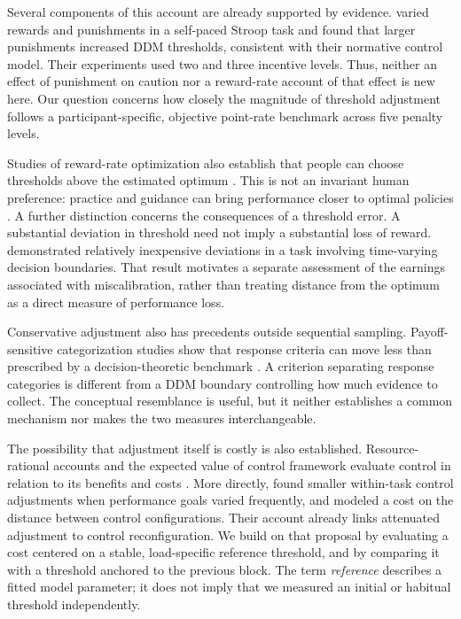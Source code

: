 \documentclass[10pt,letterpaper]{article}
\begin{document}
Several components of this account are already supported by evidence. \citet{leng2021} varied rewards and punishments in a self-paced Stroop task and found that larger punishments increased DDM thresholds, consistent with their normative control model. Their experiments used two and three incentive levels. Thus, neither an effect of punishment on caution nor a reward-rate account of that effect is new here. Our question concerns how closely the magnitude of threshold adjustment follows a participant-specific, objective point-rate benchmark across five penalty levels.

Studies of reward-rate optimization also establish that people can choose thresholds above the estimated optimum \citep{bogacz2010,simen2009,starns2012}. This is not an invariant human preference: practice and guidance can bring performance closer to optimal policies \citep{balci2011,evans2017}. A further distinction concerns the consequences of a threshold error. A substantial deviation in threshold need not imply a substantial loss of reward. \citet{malhotra2017} demonstrated relatively inexpensive deviations in a task involving time-varying decision boundaries. That result motivates a separate assessment of the earnings associated with miscalibration, rather than treating distance from the optimum as a direct measure of performance loss.

Conservative adjustment also has precedents outside sequential sampling. Payoff-sensitive categorization studies show that response criteria can move less than prescribed by a decision-theoretic benchmark \citep{maddox1998}. A criterion separating response categories is different from a DDM boundary controlling how much evidence to collect. The conceptual resemblance is useful, but it neither establishes a common mechanism nor makes the two measures interchangeable.

The possibility that adjustment itself is costly is also established. Resource-rational accounts and the expected value of control framework evaluate control in relation to its benefits and costs \citep{lieder2020,shenhav2013}. More directly, \citet{grahek2022} found smaller within-task control adjustments when performance goals varied frequently, and modeled a cost on the distance between control configurations. Their account already links attenuated adjustment to control reconfiguration. We build on that proposal by evaluating a cost centered on a stable, load-specific reference threshold, and by comparing it with a threshold anchored to the previous block. The term \emph{reference} describes a fitted model parameter; it does not imply that we measured an initial or habitual threshold independently.
\end{document}
